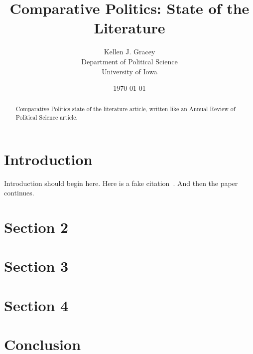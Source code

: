 \documentclass{article}
\author{Kellen J. Gracey \\
        Department of Political Science \\
        University of Iowa}
\date{\today}
\title{Comparative Politics: State of the Literature}
\begin{document}

\maketitle

\begin{abstract}

Comparative Politics state of the literature article, written like an Annual Review of Political Science article.

\end{abstract}

\section*{Introduction}

Introduction should begin here.  Here is a fake citation~\cite{Gracey:2014}.  And then the paper continues.

\section*{Section 2}

\section*{Section 3}

\section*{Section 4}

\section*{Conclusion}



\end{document}
